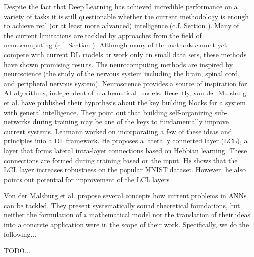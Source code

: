 Despite the fact that Deep Learning has achieved incredible performance on a variety of tasks it is still questionable whether the current methodology is enough to achieve real (or at least more advanced) intelligence (c.f. Section ).
Many of the current limitations are tackled by approaches from the field of neurocomputing (c.f. Section ).
Although many of the methods cannot yet compete with current DL models or work only on small data sets, these methods have shown promising results.
The neurocomputing methods are inspired by neuroscience (the study of the nervous system including the brain, spinal cord, and peripheral nervous system).
Neuroscience provides a source of inspiration for AI algorithms, independent of mathematical models.
Recently, von der Malsburg et al.  have published their hypothesis about the key building blocks for a system with general intelligence.
They point out that building self-organizing sub-networks during training may be one of the keys to fundamentally improve current systems.
Lehmann  worked on incorporating a few of these ideas and principles into a DL framework.
He proposes a laterally connected layer (LCL), a layer that forms lateral intra-layer connections based on Hebbian learning.
These connections are formed during training based on the input.
He shows that the LCL layer increases robustness on the popular MNIST dataset.
However, he also points out potential for improvement of the LCL layers.

Von der Malsburg et al. \cite{von_der_Malsburg_Stadelmann_Grewe_2022} propose several concepts how current problems in ANNs can be tackled.
They present systematically sound theoretical foundations, but neither the formulation of a mathematical model nor the translation of their ideas into a concrete application were in the scope of their work.
Specifically, we do the following...

TODO...




















